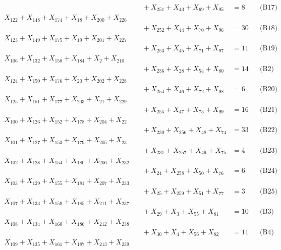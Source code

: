 \documentclass[a4paper,10pt]{article}
\begin{document}
{\begin{align}
&\quad  + X_{251} + X_{43} + X_{69} + X_{95} &= 8 && \text{(B17)} \\
\allowbreak
X_{122} + X_{148} + X_{174} + X_{18} + X_{200} + X_{226} \\[0.5ex]
&\quad  + X_{252} + X_{44} + X_{70} + X_{96} &= 30 && \text{(B18)} \\
X_{123} + X_{149} + X_{175} + X_{19} + X_{201} + X_{227} \\[0.5ex]
&\quad  + X_{253} + X_{45} + X_{71} + X_{97} &= 11 && \text{(B19)} \\
X_{106} + X_{132} + X_{158} + X_{184} + X_{2} + X_{210} \\[0.5ex]
&\quad  + X_{236} + X_{28} + X_{54} + X_{80} &= 14 && \text{(B2)} \\
X_{124} + X_{150} + X_{176} + X_{20} + X_{202} + X_{228} \\[0.5ex]
&\quad  + X_{254} + X_{46} + X_{72} + X_{98} &= 6 && \text{(B20)} \\
X_{125} + X_{151} + X_{177} + X_{203} + X_{21} + X_{229} \\[0.5ex]
&\quad  + X_{255} + X_{47} + X_{73} + X_{99} &= 16 && \text{(B21)} \\
X_{100} + X_{126} + X_{152} + X_{178} + X_{204} + X_{22} \\[0.5ex]
&\quad  + X_{230} + X_{256} + X_{48} + X_{74} &= 33 && \text{(B22)} \\
X_{101} + X_{127} + X_{153} + X_{179} + X_{205} + X_{23} \\[0.5ex]
&\quad  + X_{231} + X_{257} + X_{49} + X_{75} &= 4 && \text{(B23)} \\
X_{102} + X_{128} + X_{154} + X_{180} + X_{206} + X_{232} \\[0.5ex]
&\quad  + X_{24} + X_{258} + X_{50} + X_{76} &= 6 && \text{(B24)} \\
X_{103} + X_{129} + X_{155} + X_{181} + X_{207} + X_{233} \\[0.5ex]
&\quad  + X_{25} + X_{259} + X_{51} + X_{77} &= 3 && \text{(B25)} \\
X_{107} + X_{133} + X_{159} + X_{185} + X_{211} + X_{237} \\[0.5ex]
&\quad  + X_{29} + X_{3} + X_{55} + X_{81} &= 10 && \text{(B3)} \\
X_{108} + X_{134} + X_{160} + X_{186} + X_{212} + X_{238} \\[0.5ex]
&\quad  + X_{30} + X_{4} + X_{56} + X_{82} &= 11 && \text{(B4)} \\
X_{109} + X_{135} + X_{161} + X_{187} + X_{213} + X_{239} \\[0.5ex]

\end{align}}
\end{document}
